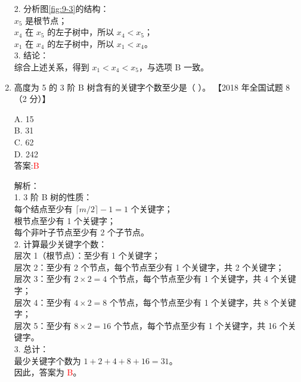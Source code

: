 \documentclass[lang=cn,newtx,10pt,scheme=chinese]{../../../elegantbook}
\begin{document}
\begin{enumerate}
    2. 分析图\ref{fig:9-3}的结构：\\
        $x_5$ 是根节点；\\
        $x_4$ 在 $x_5$ 的左子树中，所以 $x_4 < x_5$；\\
        $x_1$ 在 $x_4$ 的左子树中，所以 $x_1 < x_4$。\\

    3. 结论：\\
       综合上述关系，得到 $x_1 < x_4 < x_5$，与选项 B 一致。\\



\item 高度为 5 的 3 阶 B 树含有的关键字个数至少是（ ）。  
    【2018 年全国试题 8（2 分）】  

    A. 15 \\  
    B. 31 \\  
    C. 62 \\  
    D. 242 \\  

    答案:\textcolor{red}{B}

    解析：\\
    1. 3 阶 B 树的性质：\\
        每个结点至少有 $\lceil m/2 \rceil - 1 = 1$ 个关键字；\\
        根节点至少有 1 个关键字；\\
        每个非叶子节点至少有 2 个子节点。\\

    2. 计算最少关键字个数：\\
        层次 1（根节点）：至少有 1 个关键字；\\
        层次 2：至少有 2 个节点，每个节点至少有 1 个关键字，共 2 个关键字；\\
        层次 3：至少有 $2 \times 2 = 4$ 个节点，每个节点至少有 1 个关键字，共 4 个关键字；\\
        层次 4：至少有 $4 \times 2 = 8$ 个节点，每个节点至少有 1 个关键字，共 8 个关键字；\\
        层次 5：至少有 $8 \times 2 = 16$ 个节点，每个节点至少有 1 个关键字，共 16 个关键字。\\

    3. 总计：\\
       最少关键字个数为 $1 + 2 + 4 + 8 + 16 = 31$。\\

    因此，答案为 \textcolor{red}{B}。\\




\end{enumerate}
\end{document}
